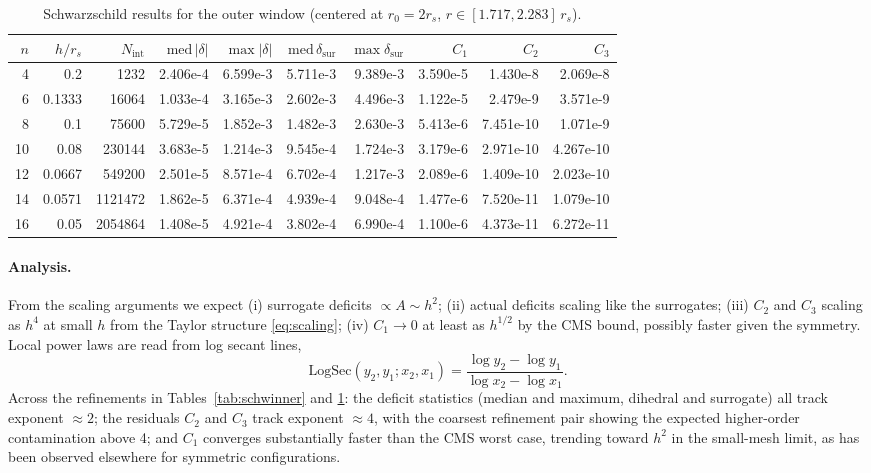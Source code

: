 \documentclass[11pt,letterpaper]{article}
\begin{document}
\begin{table}[ht]\centering\small
\begin{tabular}{rrrrrrrrrr}
\toprule
$n$ & $h/r_{s}$ & $N_{\mathrm{int}}$ & $\mathrm{med}\,|\delta|$ & $\max|\delta|$ & $\mathrm{med}\,\delta_{\mathrm{sur}}$ & $\max\delta_{\mathrm{sur}}$ & $C_{1}$ & $C_{2}$ & $C_{3}$\\
\midrule
4 & 0.2 & 1232 & 2.406e-4 & 6.599e-3 & 5.711e-3 & 9.389e-3 & 3.590e-5 & 1.430e-8 & 2.069e-8\\
6 & 0.1333 & 16064 & 1.033e-4 & 3.165e-3 & 2.602e-3 & 4.496e-3 & 1.122e-5 & 2.479e-9 & 3.571e-9\\
8 & 0.1 & 75600 & 5.729e-5 & 1.852e-3 & 1.482e-3 & 2.630e-3 & 5.413e-6 & 7.451e-10 & 1.071e-9\\
10 & 0.08 & 230144 & 3.683e-5 & 1.214e-3 & 9.545e-4 & 1.724e-3 & 3.179e-6 & 2.971e-10 & 4.267e-10\\
12 & 0.0667 & 549200 & 2.501e-5 & 8.571e-4 & 6.702e-4 & 1.217e-3 & 2.089e-6 & 1.409e-10 & 2.023e-10\\
14 & 0.0571 & 1121472 & 1.862e-5 & 6.371e-4 & 4.939e-4 & 9.048e-4 & 1.477e-6 & 7.520e-11 & 1.079e-10\\
16 & 0.05 & 2054864 & 1.408e-5 & 4.921e-4 & 3.802e-4 & 6.990e-4 & 1.100e-6 & 4.373e-11 & 6.272e-11\\
\bottomrule
\end{tabular}
\caption{Schwarzschild results for the outer window (centered at $r_{0}=2r_{s}$, $r\in[1.717,2.283]\,r_{s}$).}
\label{tab:schwouter}
\end{table}

\paragraph{Analysis.} From the scaling arguments we expect (i) surrogate deficits $\propto A\sim h^{2}$; (ii) actual deficits scaling like the surrogates; (iii) $C_{2}$ and $C_{3}$ scaling as $h^{4}$ at small $h$ from the Taylor structure \eqref{eq:scaling}; (iv) $C_{1}\to 0$ at least as $h^{1/2}$ by the CMS bound, possibly faster given the symmetry. Local power laws are read from log secant lines,
\begin{equation}
\mathrm{LogSec}(y_{2},y_{1};x_{2},x_{1})=\frac{\log y_{2}-\log y_{1}}{\log x_{2}-\log x_{1}}.
\label{eq:logsec}
\end{equation}
Across the refinements in Tables~\ref{tab:schwinner} and \ref{tab:schwouter}: the deficit statistics (median and maximum, dihedral and surrogate) all track exponent $\approx 2$; the residuals $C_{2}$ and $C_{3}$ track exponent $\approx 4$, with the coarsest refinement pair showing the expected higher-order contamination above 4; and $C_{1}$ converges substantially faster than the CMS worst case, trending toward $h^{2}$ in the small-mesh limit, as has been observed elsewhere for symmetric configurations.
\end{document}
